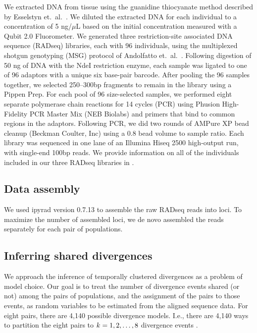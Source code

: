 We extracted DNA from tissue using the guanidine thiocyanate method described
by Esselstyn et.\ al.\ \citeyear{Esselstyn2008}.
We diluted the extracted DNA for each individual to a concentration of 5
ng/$\mu$L based on the initial concentration measured with a Qubit 2.0
Fluorometer.
We generated three restriction-site associated DNA sequence (RADseq) libraries,
each with 96 individuals, using the multiplexed shotgun genotyping (MSG)
protocol of Andolfatto et.\ al.\ \citep{Andolfatto2011}.
Following digestion of 50 ng of DNA with the NdeI restriction enzyme, each
sample was ligated to one of 96 adaptors with a unique six base-pair barcode.
After pooling the 96 samples together, we selected 250--300bp fragments to
remain in the library using a Pippen Prep.
For each pool of 96 size-selected samples, we performed eight separate
polymerase chain reactions for 14 cycles (PCR) using Phusion High-Fidelity PCR
Master Mix (NEB Biolabs) and primers that bind to common regions in the
adaptors.
Following PCR, we did two rounds of AMPure XP bead cleanup (Beckman Coulter,
Inc) using a 0.8 bead volume to sample ratio.
Each library was sequenced in one lane of an Illumina Hiseq 2500 high-output
run, with single-end 100bp reads.
We provide information on all of the individuals included in our three RADseq
libraries in .

\subsection{Data assembly}
We used ipyrad version 0.7.13 \citep{ipyrad0713} to assemble the raw RADseq
reads into loci.
To maximize the number of assembled loci, we de novo assembled the reads
separately for each pair of populations.

\subsection{Inferring shared divergences}
We approach the inference of temporally clustered divergences as a problem of
model choice.
Our goal is to treat the number of divergence events shared (or not) among the
pairs of populations, and the assignment of the pairs to those events, as
random variables to be estimated from the aligned sequence data.
For eight pairs, there are 4,140 possible divergence models.
I.e., there are 4,140 ways to partition the eight pairs to $k_{} = 1, 2,
\ldots, 8$ divergence events \citep{Bell1934,Oaks2014dpp,Oaks2018ecoevolity}.

